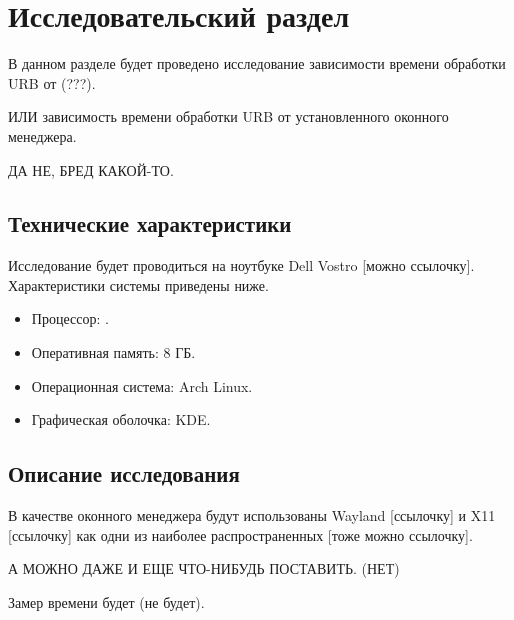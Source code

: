 \section{Исследовательский раздел}

В данном разделе будет проведено исследование зависимости времени обработки URB от (???).

ИЛИ зависимость времени обработки URB от установленного оконного менеджера.

ДА НЕ, БРЕД КАКОЙ-ТО.

\subsection{Технические характеристики}

Исследование будет проводиться на ноутбуке Dell Vostro [можно ссылочку]. Характеристики системы приведены ниже.

\begin{itemize}[leftmargin=1.6\parindent]
    \item Процессор: .
    \item Оперативная память: 8 ГБ.
    \item Операционная система: Arch Linux.
    \item Графическая оболочка: KDE.
\end{itemize}

\subsection{Описание исследования}

В качестве оконного менеджера будут использованы Wayland [ссылочку] и X11 [ссылочку] как одни из наиболее распространенных [тоже можно ссылочку].

А МОЖНО ДАЖЕ И ЕЩЕ ЧТО-НИБУДЬ ПОСТАВИТЬ. (НЕТ)

Замер времени будет (не будет).

\pagebreak
